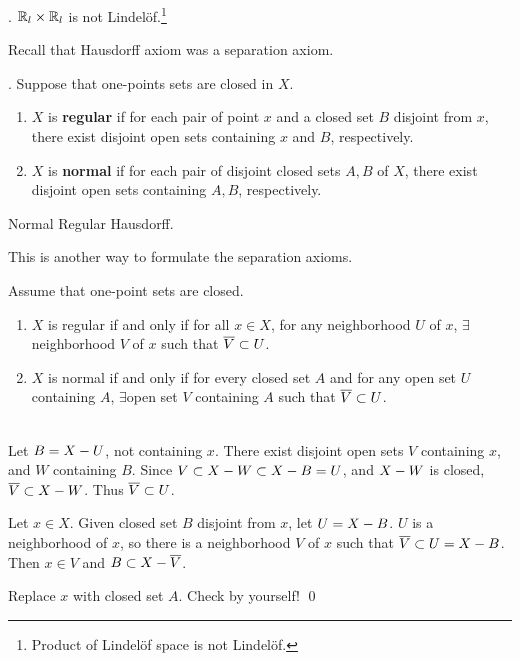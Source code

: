 \ex. \(\mathbb{R}_l \times \mathbb{R}_l\) is not Lindelöf.\footnote{Product of Lindelöf space is not Lindelöf.}

\pagebreak


Recall that Hausdorff axiom was a separation axiom.

. Suppose that one-points sets are closed in \(X\).
\begin{enumerate}
    \item {} \(X\) is \textbf{regular} if for each pair of point \(x\) and a closed set \(B\) disjoint from \(x\), there exist disjoint open sets containing \(x\) and \(B\), respectively.
    \item {} \(X\) is \textbf{normal} if for each pair of disjoint closed sets \(A, B\) of \(X\), there exist disjoint open sets containing \(A, B\), respectively.
\end{enumerate}

\rmk Normal \mimp Regular \mimp Hausdorff.

This is another way to formulate the separation axioms.

 Assume that one-point sets are closed.
\begin{enumerate}
    \item \(X\) is regular if and only if for all \(x \in X\), for any neighborhood \(U\) of \(x\), \(\exists\)neighborhood \(V\) of \(x\) such that \(\overline{V} \subset U\).
    \item \(X\) is normal if and only if for every closed set \(A\) and for any open set \(U\) containing \(A\), \(\exists\)open set \(V\) containing \(A\) such that \(\overline{V} \subset U\).
\end{enumerate}

\pf \\
 \note{\mimp} Let \(B = X - U\), not containing \(x\). There exist disjoint open sets \(V\) containing \(x\), and \(W\) containing \(B\). Since \(V \subset X - W \subset X - B = U\), and \(X - W\) is closed, \(\overline{V} \subset X - W\). Thus \(\overline{V} \subset U\).

\note{\mimpd} Let \(x \in X\). Given closed set \(B\) disjoint from \(x\), let \(U = X - B\). \(U\) is a neighborhood of \(x\), so there is a neighborhood \(V\) of \(x\) such that \(\overline{V} \subset U = X - B\). Then \(x \in V\) and \(B \subset X - \overline{V}\).

 Replace \(x\) with closed set \(A\). Check by yourself! \qed

